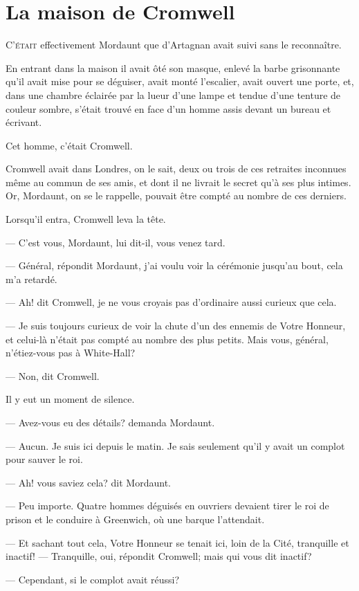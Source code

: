 \chapter{La maison de Cromwell}

\lettrine{C}{'était} effectivement Mordaunt que d'Artagnan avait suivi sans le reconnaître.

\zz
En entrant dans la maison il avait ôté son masque, enlevé la barbe grisonnante qu'il avait mise pour se déguiser, avait monté l'escalier, avait ouvert une porte, et, dans une chambre éclairée par la lueur d'une lampe et tendue d'une tenture de couleur sombre, s'était trouvé en face d'un homme assis devant un bureau et écrivant.

Cet homme, c'était Cromwell.

Cromwell avait dans Londres, on le sait, deux ou trois de ces retraites inconnues même au commun de ses amis, et dont il ne livrait le secret qu'à ses plus intimes. Or, Mordaunt, on se le rappelle, pouvait être compté au nombre de ces derniers.

Lorsqu'il entra, Cromwell leva la tête.

— C'est vous, Mordaunt, lui dit-il, vous venez tard.

— Général, répondit Mordaunt, j'ai voulu voir la cérémonie jusqu'au bout, cela m'a retardé.

— Ah! dit Cromwell, je ne vous croyais pas d'ordinaire aussi curieux que cela.

— Je suis toujours curieux de voir la chute d'un des ennemis de Votre Honneur, et celui-là n'était pas compté au nombre des plus petits. Mais vous, général, n'étiez-vous pas à White-Hall?

— Non, dit Cromwell.

Il y eut un moment de silence.

— Avez-vous eu des détails? demanda Mordaunt.

— Aucun. Je suis ici depuis le matin. Je sais seulement qu'il y avait un complot pour sauver le roi.

— Ah! vous saviez cela? dit Mordaunt.

— Peu importe. Quatre hommes déguisés en ouvriers devaient tirer le roi de prison et le conduire à Greenwich, où une barque l'attendait.

— Et sachant tout cela, Votre Honneur se tenait ici, loin de la Cité, tranquille et inactif!
— Tranquille, oui, répondit Cromwell; mais qui vous dit inactif?

— Cependant, si le complot avait réussi?

